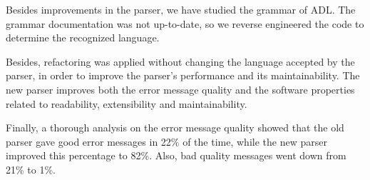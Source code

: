 Besides improvements in the parser, we have studied the grammar of ADL.
The grammar documentation was not up-to-date, so we reverse engineered the code to determine the recognized language.

Besides, refactoring was applied without changing the language accepted by the parser, in order to improve the parser's performance and its maintainability.
The new parser improves both the error message quality and the software properties related to readability, extensibility and maintainability.

Finally, a thorough analysis on the error message quality showed that the old parser gave good error messages in 22\% of the time, while the new parser improved this percentage to 82\%.
Also, bad quality messages went down from 21\% to 1\%.
